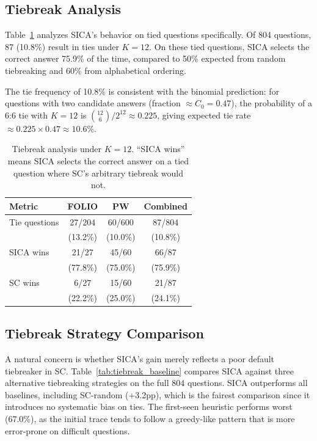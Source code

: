 \documentclass[11pt,a4paper]{article}
\begin{document}
\subsection{Tiebreak Analysis}
\label{sec:tiebreak}

Table~\ref{tab:tiebreak} analyzes SICA's behavior on tied questions specifically.
Of 804 questions, 87 (10.8\%) result in ties under $K = 12$.
On these tied questions, SICA selects the correct answer 75.9\% of the time, compared to 50\% expected from random tiebreaking and 60\% from alphabetical ordering.

The tie frequency of 10.8\% is consistent with the binomial prediction: for questions with two candidate answers (fraction $\approx C_0 = 0.47$), the probability of a 6:6 tie with $K = 12$ is $\binom{12}{6}/2^{12} \approx 0.225$, giving expected tie rate $\approx 0.225 \times 0.47 \approx 10.6\%$.

\begin{table}[t]
\centering
\small
\begin{tabular}{lccc}
\toprule
\textbf{Metric} & \textbf{FOLIO} & \textbf{PW} & \textbf{Combined} \\
\midrule
Tie questions     & 27/204   & 60/600   & 87/804   \\
                  & (13.2\%) & (10.0\%) & (10.8\%) \\
SICA wins         & 21/27    & 45/60    & 66/87    \\
                  & (77.8\%) & (75.0\%) & (75.9\%) \\
SC wins           & 6/27     & 15/60    & 21/87    \\
                  & (22.2\%) & (25.0\%) & (24.1\%) \\
\bottomrule
\end{tabular}
\caption{Tiebreak analysis under $K = 12$. ``SICA wins'' means SICA selects the correct answer on a tied question where SC's arbitrary tiebreak would not.}
\label{tab:tiebreak}
\end{table}


\subsection{Tiebreak Strategy Comparison}
\label{sec:tiebreak_baselines}

A natural concern is whether SICA's gain merely reflects a poor default tiebreaker in SC.
Table~\ref{tab:tiebreak_baseline} compares SICA against three alternative tiebreaking strategies on the full 804 questions.
SICA outperforms all baselines, including SC-random (+3.2pp), which is the fairest comparison since it introduces no systematic bias on ties.
The first-seen heuristic performs worst (67.0\%), as the initial trace tends to follow a greedy-like pattern that is more error-prone on difficult questions.
\end{document}

